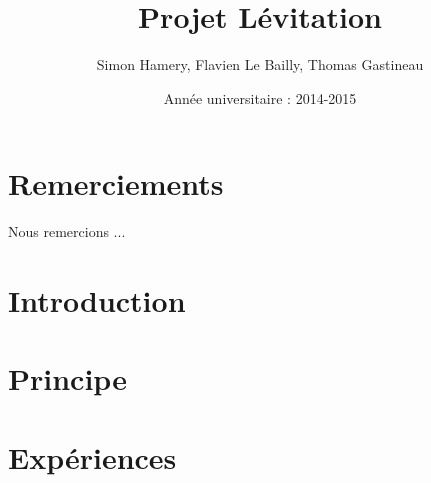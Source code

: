 \documentclass[a4paper,11pt]{report}
\title{Projet Lévitation}
\date{Année universitaire :  2014-2015}
\author{Simon Hamery, Flavien Le Bailly, Thomas Gastineau}
\begin{document}
\maketitle  %
\newpage  %

 \setcounter{page}{1} %
\chapter*{Remerciements} %
Nous remercions ...

\newpage
\null
\thispagestyle{empty}
\newpage

{\tableofcontents} 
\listoffigures


\newpage

\chapter*{Introduction}
 \setcounter{page}{1} %


 


\chapter{Principe}
\chapter{Expériences}
\end{document}
